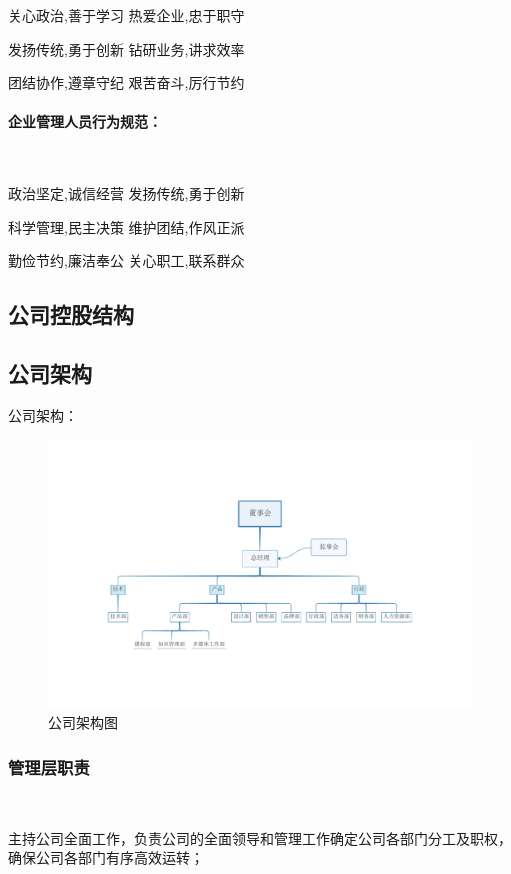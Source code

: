 关心政治,善于学习 热爱企业,忠于职守

发扬传统,勇于创新 钻研业务,讲求效率

团结协作,遵章守纪 艰苦奋斗,厉行节约

\paragraph{企业管理人员行为规范：}\

政治坚定,诚信经营 发扬传统,勇于创新

科学管理,民主决策 维护团结,作风正派

勤俭节约,廉洁奉公 关心职工,联系群众

\subsection{公司控股结构}

\subsection{公司架构}
公司架构：
\begin{figure}[H]
	\centering
	\includegraphics[width=0.9\columnwidth]{figures/management_layer}
	\caption{公司架构图}
	\label{fg:management_layer}
\end{figure}

\subsubsection{管理层职责}\

主持公司全面工作，负责公司的全面领导和管理工作确定公司各部门分工及职权，确保公司各部门有序高效运转；

